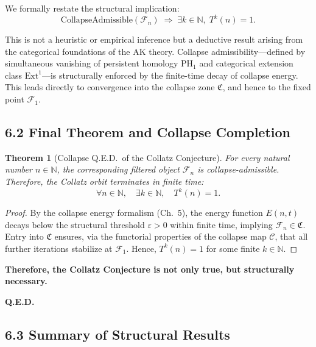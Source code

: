 \documentclass[11pt]{article}
\newtheorem{theorem}{Theorem}[section]
\begin{document}
We formally restate the structural implication:
\[
\text{CollapseAdmissible}(\mathcal{F}_n) \;\Rightarrow\; \exists k \in \mathbb{N},\; T^k(n) = 1.
\]

This is not a heuristic or empirical inference but a deductive result arising from the categorical foundations of the AK theory. Collapse admissibility—defined by simultaneous vanishing of persistent homology \( \mathrm{PH}_1 \) and categorical extension class \( \mathrm{Ext}^1 \)—is structurally enforced by the finite-time decay of collapse energy. This leads directly to convergence into the collapse zone \( \mathfrak{C} \), and hence to the fixed point \( \mathcal{F}_1 \).

\subsection{6.2 Final Theorem and Collapse Completion}

\begin{theorem}[Collapse Q.E.D.\ of the Collatz Conjecture]
For every natural number \( n \in \mathbb{N} \), the corresponding filtered object \( \mathcal{F}_n \) is collapse-admissible. Therefore, the Collatz orbit terminates in finite time:
\[
\forall n \in \mathbb{N},\quad \exists k \in \mathbb{N},\quad T^k(n) = 1.
\]
\end{theorem}

\begin{proof}
By the collapse energy formalism (Ch.~5), the energy function \( E(n,t) \) decays below the structural threshold \( \varepsilon > 0 \) within finite time, implying \( \mathcal{F}_n \in \mathfrak{C} \).  
Entry into \( \mathfrak{C} \) ensures, via the functorial properties of the collapse map \( \mathcal{C} \), that all further iterations stabilize at \( \mathcal{F}_1 \).  
Hence, \( T^k(n) = 1 \) for some finite \( k \in \mathbb{N} \).
\end{proof}

\begin{center}
\textbf{Therefore, the Collatz Conjecture is not only true, but structurally necessary.}
\end{center}

\begin{center}
\textbf{Q.E.D.}
\end{center}

\subsection{6.3 Summary of Structural Results}
\end{document}
